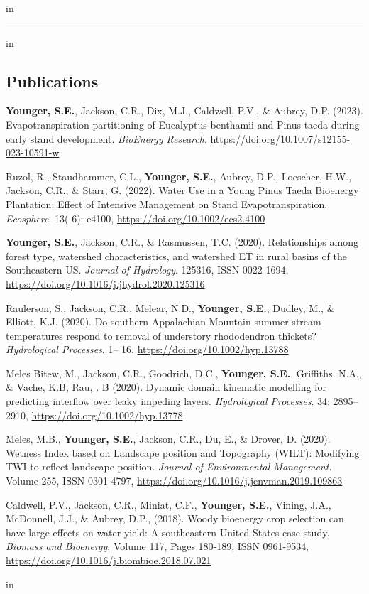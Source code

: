 \documentclass[10pt,letterpaper]{article}
\begin{document}
	\vspace{-0.4em}
	 in
	
	\hrule
	\vspace{-0.4em}
	 in
	\subsection*{Publications}
	
	\begin{hangparas}{.25in}{1}
		
		\textbf{Younger, S.E.}, Jackson, C.R., Dix, M.J., Caldwell, P.V., \& Aubrey, D.P. (2023). Evapotranspiration partitioning of Eucalyptus benthamii and Pinus taeda during early stand development. \textit{BioEnergy Research}. \url{https://doi.org/10.1007/s12155-023-10591-w}
		
		Ruzol, R., Staudhammer, C.L., \textbf{Younger, S.E.}, Aubrey, D.P., Loescher, H.W., Jackson, C.R., \& Starr, G. (2022). Water Use in a Young Pinus Taeda Bioenergy Plantation: Effect of Intensive Management on Stand Evapotranspiration. \textit{Ecosphere}. 13( 6): e4100, \url{https://doi.org/10.1002/ecs2.4100}
		
		\textbf{Younger, S.E.}, Jackson, C.R., \& Rasmussen, T.C. (2020). Relationships among forest type, watershed characteristics, and watershed ET in rural basins of the Southeastern US.
		\textit{Journal of Hydrology}. 125316, ISSN 0022-1694, \url{https://doi.org/10.1016/j.jhydrol.2020.125316}
		
		Raulerson, S., Jackson, C.R., Melear, N.D., \textbf{Younger, S.E.}, Dudley, M., \& Elliott, K.J. (2020). Do southern Appalachian Mountain summer stream temperatures respond to removal of understory rhododendron thickets? \textit{Hydrological Processes}. 1– 16, \url{https://doi.org/10.1002/hyp.13788}
		
		Meles Bitew, M., Jackson, C.R., Goodrich, D.C., \textbf{Younger, S.E.}, Griffiths. N.A., \& Vache, K.B, Rau, . B (2020). Dynamic domain kinematic modelling for predicting interflow over leaky impeding layers. \textit{Hydrological Processes}. 34: 2895– 2910, \url{https://doi.org/10.1002/hyp.13778}
		
		Meles, M.B., \textbf{Younger, S.E.}, Jackson, C.R., Du, E., \& Drover, D. (2020). Wetness Index based on Landscape position and Topography (WILT): Modifying TWI to reflect landscape position. \textit{Journal of Environmental Management}. Volume 255, ISSN 0301-4797, \url{https://doi.org/10.1016/j.jenvman.2019.109863}
		
		Caldwell, P.V., Jackson, C.R., Miniat, C.F., \textbf{Younger, S.E.}, Vining, J.A., McDonnell, J.J., \& Aubrey, D.P., (2018). Woody bioenergy crop selection can have large effects on water yield: A southeastern United States case study.
		\textit{Biomass and Bioenergy}. Volume 117, Pages 180-189, ISSN 0961-9534, \url{https://doi.org/10.1016/j.biombioe.2018.07.021}
		
		 in
		\vspace{-0.4em}
		
	\end{hangparas}
	
\end{document}
